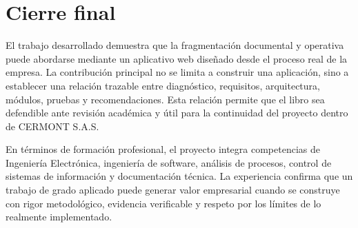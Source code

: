\section{Cierre final}
\label{sec:cierre-final-ampliado}

El trabajo desarrollado demuestra que la fragmentación documental y operativa puede abordarse mediante un aplicativo web diseñado desde el proceso real de la empresa. La contribución principal no se limita a construir una aplicación, sino a establecer una relación trazable entre diagnóstico, requisitos, arquitectura, módulos, pruebas y recomendaciones. Esta relación permite que el libro sea defendible ante revisión académica y útil para la continuidad del proyecto dentro de CERMONT S.A.S.

En términos de formación profesional, el proyecto integra competencias de Ingeniería Electrónica, ingeniería de software, análisis de procesos, control de sistemas de información y documentación técnica. La experiencia confirma que un trabajo de grado aplicado puede generar valor empresarial cuando se construye con rigor metodológico, evidencia verificable y respeto por los límites de lo realmente implementado.

